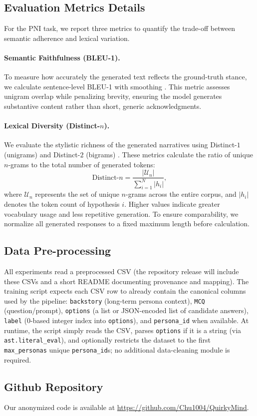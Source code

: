 \subsection{Evaluation Metrics Details}\label{subsec:evaluation}
For the PNI task, we report three metrics to quantify the trade-off between semantic adherence and lexical variation.

\paragraph{Semantic Faithfulness (BLEU-1).}
To measure how accurately the generated text reflects the ground-truth stance, we calculate sentence-level BLEU-1 with smoothing \cite{papineni-2002-bleu,chen-2014-smoothing}. This metric assesses unigram overlap while penalizing brevity, ensuring the model generates substantive content rather than short, generic acknowledgments.

\paragraph{Lexical Diversity (Distinct-$n$).}
We evaluate the stylistic richness of the generated narratives using Distinct-$1$ (unigrams) and Distinct-$2$ (bigrams) \cite{li-2016-diversity}. These metrics calculate the ratio of unique $n$-grams to the total number of generated tokens:
\begin{equation}
    \text{Distinct-}n = \frac{|\mathcal{U}_n|}{\sum_{i=1}^{N} |h_i|},
\end{equation}
where $\mathcal{U}_n$ represents the set of unique $n$-grams across the entire corpus, and $|h_i|$ denotes the token count of hypothesis $i$. Higher values indicate greater vocabulary usage and less repetitive generation. To ensure comparability, we normalize all generated responses to a fixed maximum length before calculation.




\subsection{Data Pre-processing}  
All experiments read a preprocessed CSV (the repository release will include these CSVs and a short README documenting provenance and mapping). The training script expects each CSV row to already contain the canonical columns used by the pipeline: \texttt{backstory} (long-term persona context), \texttt{MCQ} (question/prompt), \texttt{options} (a list or JSON-encoded list of candidate answers), \texttt{label} (0-based integer index into \texttt{options}), and \texttt{persona\_id} when available. At runtime, the script simply reads the CSV, parses \texttt{options} if it is a string (via \texttt{ast.literal\_eval}), and optionally restricts the dataset to the first \texttt{max\_personas} unique \texttt{persona\_id}s; no additional data-cleaning module is required.


\subsection{Github Repository}
Our anonymized code is available at \url{https://github.com/Chu1004/QuirkyMind}.
